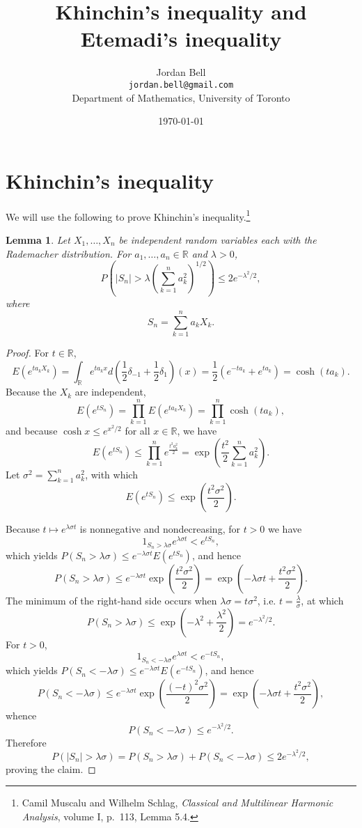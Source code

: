 \documentclass{article}
\newtheorem{lemma}[theorem]{Lemma}
\theoremstyle{definition}
\begin{document}
\title{Khinchin's inequality and Etemadi's inequality}
\author{Jordan Bell\\ \texttt{jordan.bell@gmail.com}\\Department of Mathematics, University of Toronto}
\date{\today}

\maketitle



\section{Khinchin's inequality}
We will use the following to prove Khinchin's inequality.\footnote{Camil Muscalu and Wilhelm Schlag, {\em Classical and Multilinear Harmonic Analysis}, volume I,
p.~113, Lemma 5.4.}

\begin{lemma}
Let $X_1,\ldots,X_n$ be independent random variables each with the Rademacher distribution. For $a_1,\ldots,a_n \in \mathbb{R}$ and $\lambda>0$,
\[
P\left(\left|S_n \right| > \lambda \left(\sum_{k=1}^n a_k^2 \right)^{1/2}\right) \leq 2e^{-\lambda^2/2},
\]
where
\[
S_n=\sum_{k=1}^n a_k X_k.
\]
\end{lemma}
\begin{proof}
For $t \in \mathbb{R}$,
\[
E(e^{ta_k X_k}) = \int_\mathbb{R} e^{ta_kx} d\left(\frac{1}{2}\delta_{-1}+\frac{1}{2}\delta_1\right)(x)
=\frac{1}{2}(e^{-ta_k}+e^{ta_k})
=\cosh (ta_k).
\]
Because
the $X_k$ are independent,
\[
E(e^{tS_n}) = \prod_{k=1}^n E(e^{ta_k X_k})= \prod_{k=1}^n \cosh(ta_k),
\]
and because $\cosh x\leq e^{x^2/2}$ for all $x \in \mathbb{R}$, we have
\[
E(e^{tS_n}) \leq \prod_{k=1}^n e^{\frac{t^2 a_k^2}{2}}
=\exp\left(\frac{t^2}{2} \sum_{k=1}^n a_k^2\right).
\]
Let $\sigma^2=\sum_{k=1}^n a_k^2$, with which
\[
E(e^{tS_n})  \leq \exp\left(\frac{t^2 \sigma^2}{2}\right).
\]

Because $t \mapsto e^{\lambda \sigma t}$ is nonnegative and nondecreasing, for $t>0$ we have
\[
1_{S_n>\lambda \sigma} e^{\lambda \sigma t} < e^{t S_n},
\]
which yields $P(S_n>\lambda \sigma) \leq e^{-\lambda \sigma t} E(e^{tS_n})$, and
hence 
\[
P(S_n>\lambda \sigma) \leq e^{-\lambda \sigma t}  \exp\left(\frac{t^2 \sigma^2}{2}\right)
=\exp\left(-\lambda \sigma t  + \frac{t^2 \sigma^2}{2}\right).
\]
The minimum of the right-hand side occurs when $\lambda \sigma = t \sigma^2$, i.e. $t = \frac{\lambda}{\sigma}$, at which
\[
P(S_n>\lambda \sigma) \leq \exp\left(-\lambda^2 + \frac{\lambda^2}{2}\right)
=e^{-\lambda^2/2}.
\]
For $t>0$,
\[
1_{S_n<-\lambda \sigma} e^{\lambda \sigma t} < e^{-tS_n},
\]
which yields $P(S_n<-\lambda \sigma) \leq e^{-\lambda \sigma t} E(e^{-tS_n})$, and hence
\[
P(S_n<-\lambda \sigma) \leq
e^{-\lambda \sigma t} \exp\left( \frac{(-t)^2 \sigma^2}{2}\right)=
 \exp\left(-\lambda \sigma t  + \frac{t^2 \sigma^2}{2} \right),
\]
whence
\[
P(S_n<-\lambda \sigma) \leq e^{-\lambda^2/2}.
\]
Therefore
\[
P(|S_n|>\lambda \sigma) = P(S_n > \lambda \sigma)
+P(S_n<-\lambda \sigma)
\leq 2 e^{-\lambda^2/2},
\]
proving the claim.
\end{proof}
\end{document}
